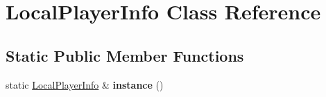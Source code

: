 \hypertarget{class_local_player_info}{\section{Local\-Player\-Info Class Reference}
\label{class_local_player_info}
}
\subsection*{Static Public Member Functions}
\begin{DoxyCompactItemize}
\item 
\hypertarget{class_local_player_info_a70650a6ce723e3d627171748fcf7de8a}{static \hyperlink{class_local_player_info}{Local\-Player\-Info} \& {\bfseries instance} ()}\label{class_local_player_info_a70650a6ce723e3d627171748fcf7de8a}

\end{DoxyCompactItemize}
